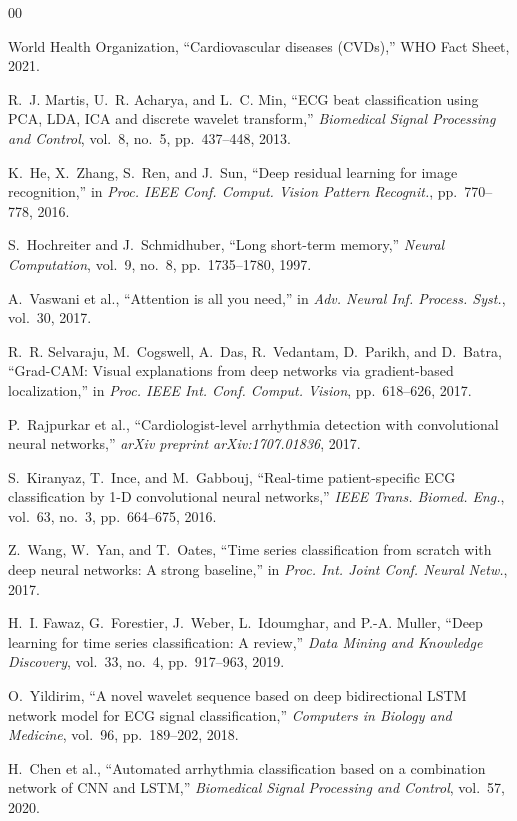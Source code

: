 \documentclass[conference]{IEEEtran}
\begin{document}
\begin{thebibliography}{00}

World Health Organization, ``Cardiovascular diseases (CVDs),'' WHO Fact Sheet, 2021.

R.~J. Martis, U.~R. Acharya, and L.~C. Min, ``ECG beat classification using PCA, LDA, ICA and discrete wavelet transform,'' \textit{Biomedical Signal Processing and Control}, vol.~8, no.~5, pp.~437--448, 2013.

K.~He, X.~Zhang, S.~Ren, and J.~Sun, ``Deep residual learning for image recognition,'' in \textit{Proc. IEEE Conf. Comput. Vision Pattern Recognit.}, pp.~770--778, 2016.

S.~Hochreiter and J.~Schmidhuber, ``Long short-term memory,'' \textit{Neural Computation}, vol.~9, no.~8, pp.~1735--1780, 1997.

A.~Vaswani et al., ``Attention is all you need,'' in \textit{Adv. Neural Inf. Process. Syst.}, vol.~30, 2017.

R.~R. Selvaraju, M.~Cogswell, A.~Das, R.~Vedantam, D.~Parikh, and D.~Batra, ``Grad-CAM: Visual explanations from deep networks via gradient-based localization,'' in \textit{Proc. IEEE Int. Conf. Comput. Vision}, pp.~618--626, 2017.

P.~Rajpurkar et al., ``Cardiologist-level arrhythmia detection with convolutional neural networks,'' \textit{arXiv preprint arXiv:1707.01836}, 2017.

S.~Kiranyaz, T.~Ince, and M.~Gabbouj, ``Real-time patient-specific ECG classification by 1-D convolutional neural networks,'' \textit{IEEE Trans. Biomed. Eng.}, vol.~63, no.~3, pp.~664--675, 2016.

Z.~Wang, W.~Yan, and T.~Oates, ``Time series classification from scratch with deep neural networks: A strong baseline,'' in \textit{Proc. Int. Joint Conf. Neural Netw.}, 2017.

H.~I. Fawaz, G.~Forestier, J.~Weber, L.~Idoumghar, and P.-A. Muller, ``Deep learning for time series classification: A review,'' \textit{Data Mining and Knowledge Discovery}, vol.~33, no.~4, pp.~917--963, 2019.

O.~Yildirim, ``A novel wavelet sequence based on deep bidirectional LSTM network model for ECG signal classification,'' \textit{Computers in Biology and Medicine}, vol.~96, pp.~189--202, 2018.

H.~Chen et al., ``Automated arrhythmia classification based on a combination network of CNN and LSTM,'' \textit{Biomedical Signal Processing and Control}, vol.~57, 2020.


\end{thebibliography}
\end{document}
